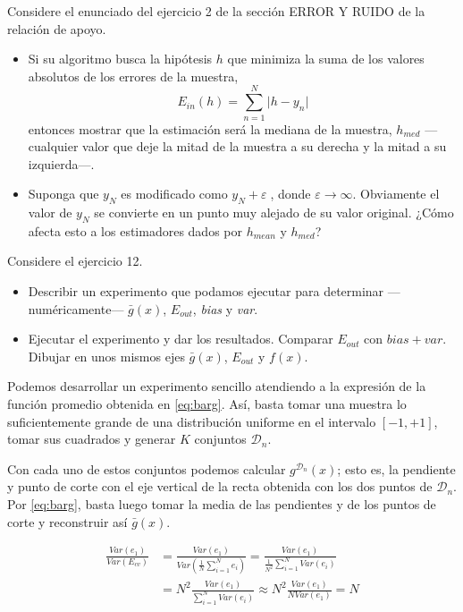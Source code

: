 \documentclass[a4paper, 11pt]{article}
\begin{document}
    \begin{bonus}
        Considere el enunciado del ejercicio 2 de la sección ERROR Y RUIDO de la relación de apoyo.
        \begin{itemize}
            \item Si su algoritmo busca la hipótesis $h$ que minimiza la suma de los valores absolutos de los errores de la muestra,
            \[
            E_{in}(h) = \sum_{n=1}^N \vert h - y_n \vert
            \]
            entonces mostrar que la estimación será la mediana de la muestra, $h_{med}$ ---cualquier valor que deje la mitad de la muestra a su derecha y la mitad a su izquierda---.
            \item Suponga que $y_N$ es modificado como $y_N + \varepsilon$, donde $\varepsilon \to \infty$. Obviamente el valor de $y_N$ se convierte en un punto muy alejado de su valor original. ¿Cómo afecta esto a los estimadores dados por $h_{mean}$ y $h_{med}$?
        \end{itemize}
    \end{bonus}



    \begin{bonus}
        Considere el ejercicio 12.
        \begin{itemize}
            \item Describir un experimento que podamos ejecutar para determinar ---numéricamente--- $\bar{g}(x)$, $E_{out}$, \emph{bias} y \emph{var}.
            \item Ejecutar el experimento y dar los resultados. Comparar $E_{out}$ con $bias+var$. Dibujar en unos mismos ejes $\bar{g}(x)$, $E_{out}$ y $f(x)$.
        \end{itemize}
    \end{bonus}

    \begin{solucion}
        Podemos desarrollar un experimento sencillo atendiendo a la expresión de la función promedio obtenida en \ref{eq:barg}. Así, basta tomar una muestra lo suficientemente grande de una distribución uniforme en el intervalo $[-1,+1]$, tomar sus cuadrados y generar $K$ conjuntos $\mathcal{D}_n$.

        Con cada uno de estos conjuntos podemos calcular $g^{\mathcal{D}_n}(x)$; esto es, la pendiente y punto de corte con el eje vertical de la recta obtenida con los dos puntos de $\mathcal{D}_n$. Por \ref{eq:barg}, basta luego tomar la media de las pendientes y de los puntos de corte y reconstruir así $\bar{g}(x)$.
    \end{solucion}

    \begin{align*}
    \frac{Var(e_1)}{Var(E_{cv})} &= \frac{Var(e_1)}{Var(\frac{1}{N}\sum_{i=1}^N e_i)} = \frac{Var(e_1)}{\frac{1}{N^2}\sum_{i=1}^NVar(e_i)}\\
    &= N^2\frac{Var(e_1)}{\sum_{i=1}^NVar(e_i)} \approx N^2\frac{Var(e_1)}{N Var(e_1)} = N
    \end{align*}

    \nocite{*}



\end{document}
